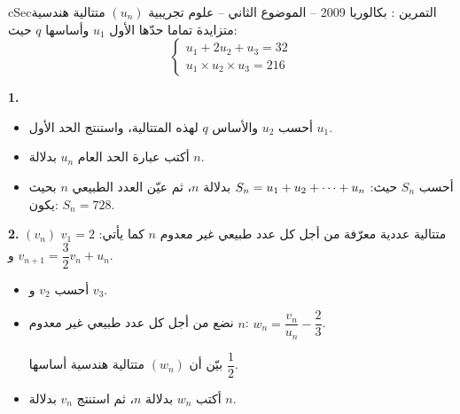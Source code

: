 \documentclass[12pt,a4paper]{article}
\newenvironment{BOX}[2]{\begin{otherlanguage}{english}\begin{arbox}{#1}{#2}}{\end{arbox}\end{otherlanguage}}
\newcounter{exo}
\newenvironment{tamrin}[1]{\stepcounter{exo}\begin{BOX}{cSec}{التمرين \theexo: #1}}{\end{BOX}}
\renewcommand{\cdots}{\mathinner{\cdotp\cdotp\cdotp}}
\newenvironment{sq}{\begin{itemize}[leftmargin=2.4em,itemsep=3pt]}{\end{itemize}}
\newcommand{\qa}{\item[(أ)]}\newcommand{\qb}{\item[(ب)]}\newcommand{\qc}{\item[(جـ)]}\newcommand{\qd}{\item[(د)]}\newcommand{\qe}{\item[(هـ)]}
\newcommand{\QQ}[1]{\par\smallskip\textbf{#1.} }
\begin{document}
\begin{tamrin}{بكالوريا 2009 -- الموضوع الثاني -- علوم تجريبية}
$(u_n)$ متتالية هندسية متزايدة تماما حدّها الأول $u_1$ وأساسها $q$ حيث:
\[\begin{cases}u_1+2u_2+u_3=32\\ u_1\times u_2\times u_3=216\end{cases}\]
\QQ{1}
\begin{sq}
\qa أحسب $u_2$ والأساس $q$ لهذه المتتالية، واستنتج الحد الأول $u_1$.
\qb أكتب عبارة الحد العام $u_n$ بدلالة $n$.
\qc أحسب $S_n$ حيث: $S_n=u_1+u_2+\cdots+u_n$ بدلالة $n$، ثم عيّن العدد الطبيعي $n$ بحيث يكون: $S_n=728$.
\end{sq}
\QQ{2} $(v_n)$ متتالية عددية معرّفة من أجل كل عدد طبيعي غير معدوم $n$ كما يأتي: $v_1=2$ و $v_{n+1}=\dfrac32v_n+u_n$.
\begin{sq}
\qa أحسب $v_2$ و $v_3$.
\qb نضع من أجل كل عدد طبيعي غير معدوم $n$: $w_n=\dfrac{v_n}{u_n}-\dfrac23$.

بيّن أن $(w_n)$ متتالية هندسية أساسها $\dfrac12$.
\qc أكتب $w_n$ بدلالة $n$، ثم استنتج $v_n$ بدلالة $n$.
\end{sq}
\end{tamrin}
\end{document}
